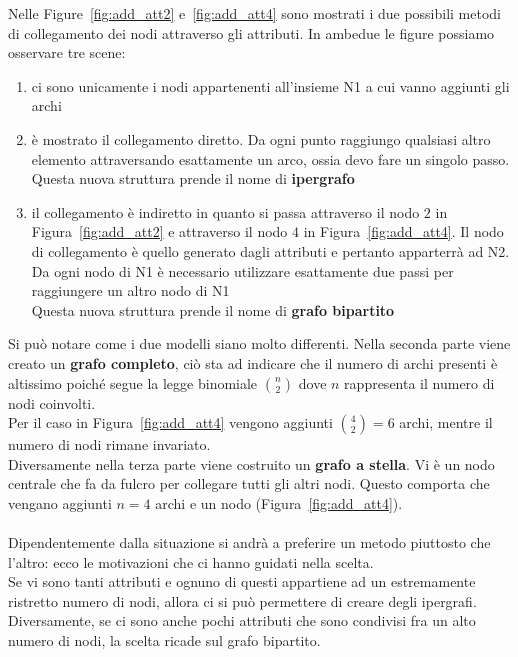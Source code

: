 %
Nelle Figure~\ref{fig:add_att2} e~\ref{fig:add_att4} sono mostrati i due possibili metodi di collegamento dei nodi attraverso gli attributi. In ambedue le figure possiamo osservare tre scene:
\begin{enumerate}
	\item ci sono unicamente i nodi appartenenti all'insieme N1 a cui vanno aggiunti gli archi
	\item è mostrato il collegamento diretto. Da ogni punto raggiungo qualsiasi altro elemento attraversando esattamente un arco, ossia devo fare un singolo passo.\\
	Questa nuova struttura prende il nome di \textbf{ipergrafo}
	\item il collegamento è indiretto in quanto si passa attraverso il nodo $2$ in Figura~\ref{fig:add_att2} e attraverso il nodo $4$ in Figura~\ref{fig:add_att4}. Il nodo di collegamento è quello generato dagli attributi e pertanto apparterrà ad N2.\\
	Da ogni nodo di N1 è necessario utilizzare esattamente due passi per raggiungere un altro nodo di N1\\
	Questa nuova struttura prende il nome di \textbf{grafo bipartito}
\end{enumerate}
%
Si può notare come i due modelli siano molto differenti. Nella seconda parte viene creato un \textbf{grafo completo}, ciò sta ad indicare che il numero di archi presenti è altissimo poiché segue la legge binomiale $ \binom{n}{2}$ dove $n$ rappresenta il numero di nodi coinvolti.\\
Per il caso in Figura~\ref{fig:add_att4} vengono aggiunti $ \binom{4}{2} = 6$ archi, mentre il numero di nodi rimane invariato.\\
Diversamente nella terza parte viene costruito un \textbf{grafo a stella}. Vi è un nodo centrale che fa da fulcro per collegare tutti gli altri nodi. Questo comporta che vengano aggiunti $n=4$ archi e un nodo (Figura~\ref{fig:add_att4}).\\
\\
Dipendentemente dalla situazione si andrà a preferire un metodo piuttosto che l'altro: ecco le motivazioni che ci hanno guidati nella scelta.\\
Se vi sono tanti attributi e ognuno di questi appartiene ad un estremamente ristretto numero di nodi, allora ci si può permettere di creare degli ipergrafi. Diversamente, se ci sono anche pochi attributi che sono condivisi fra un alto numero di nodi, la scelta ricade sul grafo bipartito.\\
